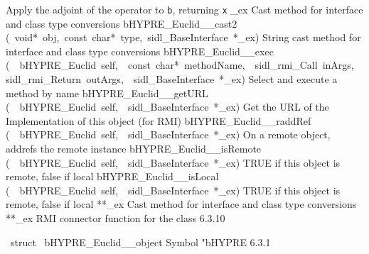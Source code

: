 \documentclass{article}
\begin{document}
\begin{cxxentry}
\begin{cxxentry}
\begin{cxxnames}
        {
Apply the adjoint of the operator to {\tt b}, returning {\tt x}}
        {}
\label{cxx.6.3.29}
        {\_ex}
        {}
        {
Cast method for interface and class type conversions}
        {}
\label{cxx.6.3.30}
        {bHYPRE\_Euclid\_\_cast2}
        {(\ void*\ obj,\ const\ char*\ type,\ sidl\_BaseInterface\ *\_ex)}
        {
String cast method for interface and class type conversions}
        {}
\label{cxx.6.3.31}
        {bHYPRE\_Euclid\_\_exec}
        {(\ \ bHYPRE\_Euclid\ self,\ \ const\ char*\ methodName,\ \ sidl\_rmi\_Call\ inArgs,\ \ sidl\_rmi\_Return\ outArgs,\ \ sidl\_BaseInterface\ *\_ex)}
        {
Select and execute a method by name}
        {}
\label{cxx.6.3.32}
        {bHYPRE\_Euclid\_\_getURL}
        {(\ \ bHYPRE\_Euclid\ self,\ \ sidl\_BaseInterface\ *\_ex)}
        {
Get the URL of the Implementation of this object (for RMI)}
        {}
\label{cxx.6.3.33}
        {bHYPRE\_Euclid\_\_raddRef}
        {(\ \ bHYPRE\_Euclid\ self,\ \ sidl\_BaseInterface\ *\_ex)}
        {
On a remote object, addrefs the remote instance}
        {}
\label{cxx.6.3.34}
        {bHYPRE\_Euclid\_\_isRemote}
        {(\ \ bHYPRE\_Euclid\ self,\ \ sidl\_BaseInterface\ *\_ex)}
        {
TRUE if this object is remote, false if local}
        {}
\label{cxx.6.3.35}
        {bHYPRE\_Euclid\_\_isLocal}
        {(\ \ bHYPRE\_Euclid\ self,\ \ sidl\_BaseInterface\ *\_ex)}
        {
TRUE if this object is remote, false if local}
        {}
\label{cxx.6.3.36}
        {**\_ex}
        {}
        {
Cast method for interface and class type conversions}
        {}
\label{cxx.6.3.37}
        {**\_ex}
        {}
        {
RMI connector function for the class}
        {6.3.10}
\end{cxxnames}
\begin{cxxvariable}
{\ struct\ }
        {bHYPRE\_Euclid\_\_object}
        {}
        {
Symbol "bHYPRE}
        {6.3.1}
\begin{cxxdoc}


\end{cxxdoc}
\end{cxxvariable}
\end{cxxentry}
\end{cxxentry}
\end{document}

